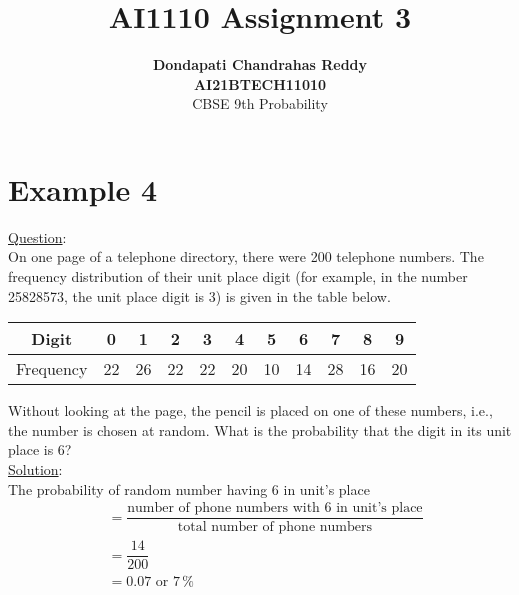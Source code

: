 \documentclass[journal,12pt,twocolumn]{IEEEtran}
\begin{document}
\title{\textbf{AI1110 Assignment 3} }
\author{\textbf{Dondapati Chandrahas Reddy}\\\textbf{AI21BTECH11010}\\ CBSE 9th Probability}
\maketitle

{\section{Example 4}}

{\large \underline{Question}:}\\

On one page of a telephone directory, there were 200 telephone numbers.
The frequency distribution of their unit place digit (for example, in the number 25828573,
the unit place digit is 3) is given in the table below.

\begin{table}[h!]
	\begin{tabular}{|c|c|c|c|c|c|c|c|c|c|c|}
		\hline
		Digit & 0 & 1 & 2 & 3 & 4 & 5 & 6 & 7 & 8 & 9 \\
		\hline
		Frequency & 22 & 26 & 22 & 22 & 20 & 10 & 14 & 28 & 16 & 20 \\
		\hline
	\end{tabular}
\end{table}

Without looking at the page, the pencil is placed on one of these numbers, i.e., the
number is chosen at random. What is the probability that the digit in its unit place is 6? \\

{\large \underline{Solution}:}\\

The probability of random number having 6 in unit's place
\begin{align}
	& = \dfrac{\text{number of phone numbers with 6 in unit's place}}{\text{total number of phone numbers}} \\
	& = \dfrac{14}{200} \\
	& = 0.07 \text{ or } 7\,\% 	
\end{align} 
\end{document}
